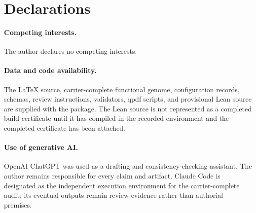 \documentclass[10pt]{article}
\begin{document}
\section*{Declarations}

\paragraph{Competing interests.} The author declares no competing interests.

\paragraph{Data and code availability.} The LaTeX source, carrier-complete functional genome, configuration records, schemas, review instructions, validators, qpdf scripts, and provisional Lean source are supplied with the package.  The Lean source is not represented as a completed build certificate until it has compiled in the recorded environment and the completed certificate has been attached.

\paragraph{Use of generative AI.} OpenAI ChatGPT was used as a drafting and consistency-checking assistant.  The author remains responsible for every claim and artifact.  Claude Code is designated as the independent execution environment for the carrier-complete audit; its eventual outputs remain review evidence rather than authorial premises.
\end{document}
